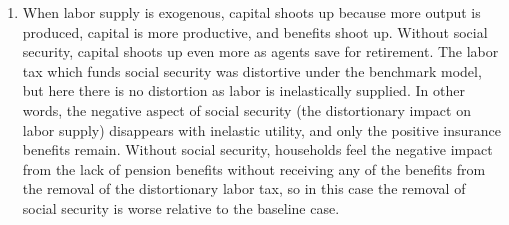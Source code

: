 \documentclass[11pt]{article} %
\begin{document}
\begin{enumerate}
\item When labor supply is exogenous, capital shoots up because more output is produced, capital is more productive, and benefits shoot up. Without social security, capital shoots up even more as agents save for retirement. The labor tax which funds social security was distortive under the benchmark model, but here there is no distortion as labor is inelastically supplied. In other words, the negative aspect of social security (the distortionary impact on labor supply) disappears with inelastic utility, and only the positive insurance benefits remain. Without social security, households feel the negative impact from the lack of pension benefits without receiving any of the benefits from the removal of the distortionary labor tax, so in this case the removal of social security is worse relative to the baseline case.
\end{enumerate}
\end{document}
